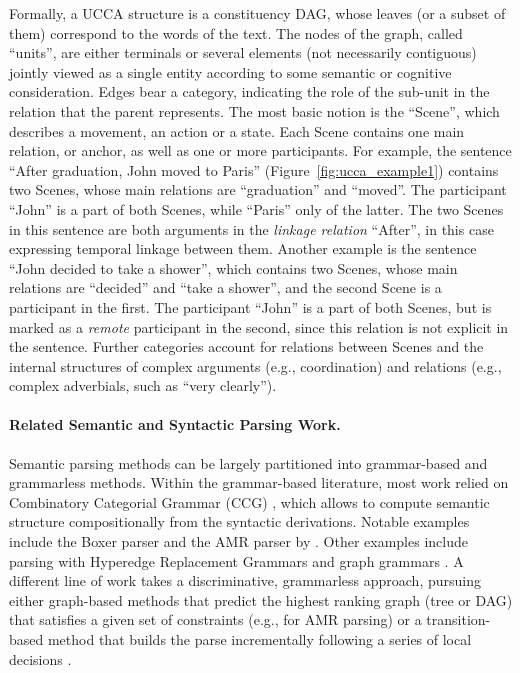 \documentclass[11pt]{article}
\newcommand{\figref}[1]{Figure~\ref{#1}}
\begin{document}
Formally, a UCCA structure is a constituency DAG, whose leaves (or a subset of them) correspond to the words of the text. The nodes of the graph, called ``units'', are either terminals or several elements (not necessarily contiguous) jointly viewed as a single entity according to some semantic or cognitive consideration.
Edges bear a category, indicating the role of the sub-unit in the relation that the parent represents. 
The most basic notion is the ``Scene'', which describes a movement, an action or a state.
Each Scene contains one main relation, or anchor, as well as one or more participants.
For example, the sentence ``After graduation, John moved to Paris'' (\figref{fig:ucca_example1}) contains two Scenes, whose main relations are ``graduation'' and ``moved''. The participant ``John'' is a part of both Scenes, while ``Paris'' only of the latter.
The two Scenes in this sentence are both arguments in the \textit{linkage relation} ``After'', in this case expressing temporal linkage between them.
Another example is the sentence ``John decided to take a shower'', which contains two Scenes, whose main relations are ``decided'' and ``take a shower'', and the second Scene is a participant in the first.
The participant ``John'' is a part of both Scenes, but is marked as a \textit{remote} participant in the second, since this relation is not explicit in the sentence.
Further categories account for relations between Scenes and the internal structures of complex arguments (e.g., coordination) and relations (e.g., complex adverbials, such as ``very clearly'').

\paragraph{Related Semantic and Syntactic Parsing Work.}
Semantic parsing methods can be largely partitioned into grammar-based and grammarless methods.
Within the grammar-based literature, most work relied on Combinatory Categorial Grammar (CCG)
\cite{Steedman:00}, which allows to compute semantic structure compositionally from the
syntactic derivations. Notable examples include the Boxer parser \cite{bos2005towards}
and the AMR parser by .
Other examples include parsing with Hyperedge Replacement Grammars
\cite{jones2012semantics,chiang2013parsing,peng2015synchronous} and
graph grammars \cite{koller2015semantic}.
A different line of work takes a discriminative, grammarless approach,
pursuing either graph-based methods that predict the highest ranking graph
(tree or DAG) that satisfies a given set of constraints
(e.g.,  for AMR parsing)
or a transition-based method that builds the parse incrementally following a series of local
decisions \cite[and much subsequent work]{Nivre03anefficient}.
\end{document}
